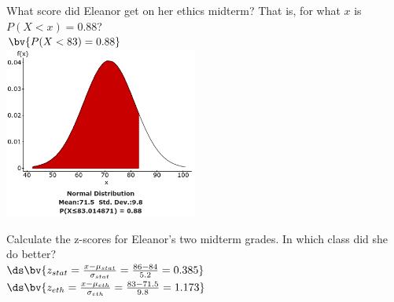 \documentclass{article}
\begin{document}
\begin{flushleft}
\begin{enumalpha}
\vspace{0.25in}
\item What score did Eleanor get on her ethics midterm? That is, for what $x$ is $P(X < x) = 0.88$? \\
\medskip
{}$\bv{P(X < 83) = 0.88}$\\
\smallskip
\includegraphics[width=2.5in]{images/group06_Q2_b}\\

\vspace{0.25in}
\item Calculate the z-scores for Eleanor's two midterm grades. In which class did she do better?\\
\medskip
$\ds \bv{z_{stat} = \frac{x - \mu_{stat}}{\sigma_{stat}} = \frac{86 - 84}{5.2} = 0.385}$\\
\medskip
$\ds \bv{z_{eth} = \frac{x - \mu_{eth}}{\sigma_{eth}} = \frac{83 - 71.5}{9.8} = 1.173}$\\
\medskip
{}


\end{enumalpha}

\end{flushleft}
\end{document}
